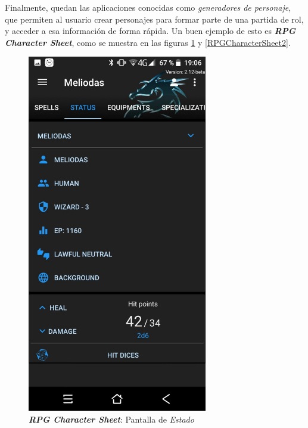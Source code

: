 Finalmente, quedan las aplicaciones conocidas como \textit{generadores de
personaje}, que permiten al usuario crear personajes para formar parte de 
una partida de rol, y acceder a esa información de forma rápida. Un buen 
ejemplo de esto es \textit{\textbf{RPG Character Sheet}}, como se muestra en 
las figuras \ref*{RPGCharacterSheet1} y \ref*{RPGCharacterSheet2}. 
\begin{figure}[H]
    \centering
    \begin{minipage}{0.3\textwidth}
        \centering
        \includegraphics[width=0.7\textwidth]{Images/RPG_Character_Sheet_1.jpeg}
        \caption{\textit{\textbf{RPG Character Sheet}}: Pantalla de \textit{Estado}}
        \label{RPGCharacterSheet1}
    \end{minipage} \hspace{2cm}
    \begin{minipage}{0.3\textwidth}
        \centering

\end{minipage}
\end{figure}
